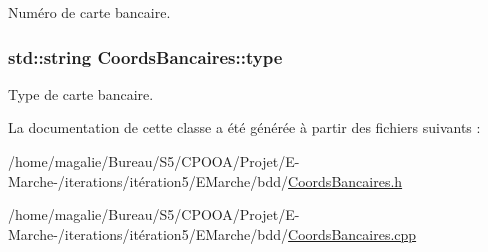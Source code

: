 Numéro de carte bancaire. 

\hypertarget{class_coords_bancaires_ad34142224a2753ad54dddf8d537564b1}{
\subsubsection[{type}]{\setlength{\rightskip}{0pt plus 5cm}std\-::string Coords\-Bancaires\-::type\hspace{0.3cm}{\ttfamily [protected]}}}\label{class_coords_bancaires_ad34142224a2753ad54dddf8d537564b1}


Type de carte bancaire. 



La documentation de cette classe a été générée à partir des fichiers suivants \-:\begin{DoxyCompactItemize}
\item 
/home/magalie/\-Bureau/\-S5/\-C\-P\-O\-O\-A/\-Projet/\-E-\/\-Marche-\//iterations/itération5/\-E\-Marche/bdd/\hyperlink{_coords_bancaires_8h}{Coords\-Bancaires.\-h}\item 
/home/magalie/\-Bureau/\-S5/\-C\-P\-O\-O\-A/\-Projet/\-E-\/\-Marche-\//iterations/itération5/\-E\-Marche/bdd/\hyperlink{_coords_bancaires_8cpp}{Coords\-Bancaires.\-cpp}\end{DoxyCompactItemize}
